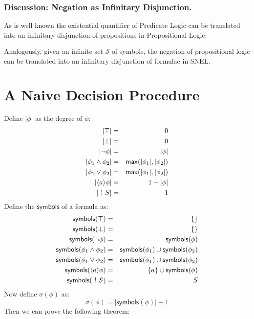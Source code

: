 \subsubsection{Discussion: Negation as Infinitary Disjunction. }
As is well known the existential quantifier of Predicate Logic can be translated into an infinitary disjunction of propositions in Propositional Logic.

Analogously, given an infinite set $\mathcal{S}$ of symbols, the negation of propositional logic can be translated into an infinitary disjunction of formulae in SNEL.



\section{A Naive Decision Procedure}
Define $|\phi|$ as the degree of $\phi$:
\begin{eqnarray}
|\top| & = & 0 \nonumber \\
|\bot| & = & 0 \nonumber \\
|\neg \phi| & = & | \phi | \nonumber \\
|\phi_1 \land \phi_2| & = & \mathsf{max}(| \phi_1 |, | \phi_2|) \nonumber \\
|\phi_1 \lor \phi_2| & = & \mathsf{max}(| \phi_1 |, | \phi_2|) \nonumber \\
|\langle a \rangle \phi | & = & 1 + | \phi | \nonumber \\
| \ ! \  S | & = & 1 \nonumber
\end{eqnarray}
Define the $\mathsf{symbols}$ of a formula as:
\begin{eqnarray}
\mathsf{symbols}(\top) & = & \{\} \nonumber \\
\mathsf{symbols}(\bot) & = & \{\} \nonumber \\
\mathsf{symbols}(\neg \phi) & = & \mathsf{symbols}(\phi) \nonumber \\
\mathsf{symbols}(\phi_1 \land \phi_2) & = &\mathsf{symbols}(\phi_1) \cup \mathsf{symbols}(\phi_2) \nonumber \\
\mathsf{symbols}(\phi_1 \lor \phi_2) & = &\mathsf{symbols}(\phi_1) \cup \mathsf{symbols}(\phi_2) \nonumber \\
\mathsf{symbols}(\langle a \rangle \phi) & = & \{a\} \cup \mathsf{symbols}(\phi) \nonumber \\
\mathsf{symbols}(\ ! \  S) & = & S \nonumber
\end{eqnarray}
Now define $\sigma(\phi)$ as:
\[
\sigma(\phi) = |\mathsf{symbols}(\phi)| + 1
\]
Then we can prove the following theorem:

